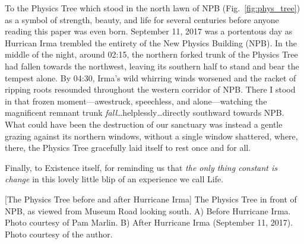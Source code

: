To the Physics Tree which stood in the north lawn of NPB (Fig.~\ref{fig:phys_tree}) as a symbol of strength, beauty, and life for several centuries before anyone reading this paper was even born.
September 11, 2017 was a portentous day as Hurrican Irma trembled the entirety of the New Physics Building (NPB).
In the middle of the night, around 02:15, the northern forked trunk of the Physics Tree had fallen towards the northwest, leaving its southern half to stand and bear the tempest alone.
By 04:30, Irma's wild whirring winds worsened and the racket of ripping roots resounded throughout the western corridor of NPB.
There I stood in that frozen moment---awestruck, speechless, and alone---watching the magnificent remnant trunk \emph{fall}\ldots helplessly\ldots directly southward towards NPB.
What could have been the destruction of our sanctuary was instead a gentle grazing against its northern windows, without a single window shattered, where, there, the Physics Tree gracefully laid itself to rest once and for all.

Finally, to Existence itself, for reminding us that \emph{the only thing constant is change} in this lovely little blip of an experience we call Life.

\begin{multiFigure}
    \centering
        [The Physics Tree before and after Hurricane Irma]
        {The Physics Tree in front of NPB, as viewed from Museum Road looking south.
        \;A) Before Hurricane Irma. Photo courtesy of Pam Marlin.
        \;B) After Hurricane Irma (September 11, 2017). Photo courtesy of the author.}
    \label{fig:phys_tree}
\end{multiFigure}